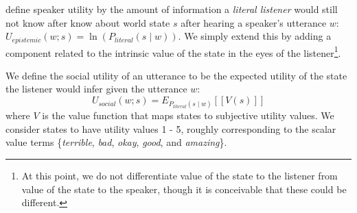 \documentclass[10pt,letterpaper]{article}
\newcommand{\denote}[1]{\mbox{ $[\![ #1 ]\!]$}}
\newcommand{\ndg}[1]{\textcolor{Green}{[ndg: #1]}}
\begin{document}
 define speaker utility by the amount of information a \emph{literal listener} would still not know after know about world state $s$ after hearing a speaker's utterance $w$: 
$U_{epistemic}(w; s) = \ln(P_{literal}(s \mid w)) $.
We simply extend this by adding a component related to the intrinsic value of the state in the eyes of the listener\footnote{At this point, we do not differentiate value of the state to the listener from value of the state to the speaker, though it is conceivable that these could be different.}.

We define the social utility of an utterance to be the expected utility of the state the listener would infer given the utterance $w$: 
%
$$
U_{social}(w; s) = E_{P_{literal}(s \mid w)}[[V(s)]]
$$
%
where $V$ is the value function that maps states to subjective utility values. 
We consider states to have utility values 1 - 5, roughly corresponding to the scalar value terms \{\emph{terrible}, \emph{bad}, \emph{okay}, \emph{good}, and \emph{amazing}\}.

\end{document}
